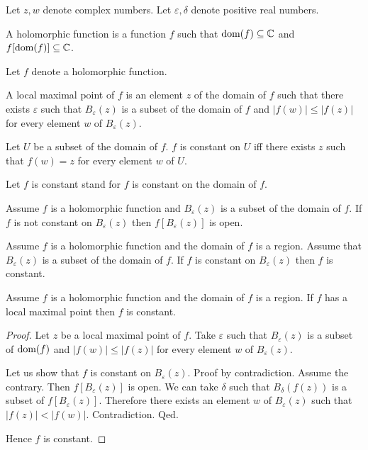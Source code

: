 \documentclass{article}
\newcommand{\Ball}[2]{B_{#1}(#2)}
\begin{document}
\begin{forthel}
Let $z, w$ denote complex numbers.
Let $\varepsilon, \delta$ denote positive real numbers.

\begin{signature}
  A holomorphic function is a function $f$ such that $\textrm{dom}(f) \subseteq \mathbb{C}$
  and $f[\textrm{dom}(f)] \subseteq \mathbb{C}$.
\end{signature}

Let $f$ denote a holomorphic function.

\begin{definition}
  A local maximal point of $f$ is an element $z$ of the domain of $f$ such that there exists
  $\varepsilon$ such that $\Ball{\varepsilon}{z}$ is a subset of the domain of $f$ and
  $|f(w)| \leq |f(z)|$ for every element $w$ of $\Ball{\varepsilon}{z}$.
\end{definition}

\begin{definition}
  Let $U$ be a subset of the domain of $f$. $f$ is constant on $U$ iff there exists
  $z$ such that $f(w) = z$ for every element $w$ of $U$.
\end{definition}

Let $f$ is constant stand for $f$ is constant on the domain of $f$.

\begin{axiom}
  Assume $f$ is a holomorphic function and $\Ball{\varepsilon}{z}$ is a subset of the domain of $f$.
  If $f$ is not constant on $\Ball{\varepsilon}{z}$
  then $f[\Ball{\varepsilon}{z}]$ is open.
\end{axiom}

\begin{axiom}
  Assume $f$ is a holomorphic function and the domain of $f$ is a region.
  Assume that $\Ball{\varepsilon}{z}$ is a subset of the domain of $f$.
  If $f$ is constant on $\Ball{\varepsilon}{z}$ then $f$ is constant.
\end{axiom}

\begin{proposition}
  Assume $f$ is a holomorphic function and the domain of $f$ is a region.
  If $f$ has a local maximal point then $f$ is constant.
\end{proposition}
\begin{proof}
  Let $z$ be a local maximal point of $f$.
  Take $\varepsilon$ such that
  $\Ball{\varepsilon}{z}$ is a subset of $\textrm{dom}(f)$
  and $|f(w)| \leq |f(z)|$ for every element $w$ of $\Ball{\varepsilon}{z}$.

  Let us show that $f$ is constant on $\Ball{\varepsilon}{z}$.\newline
  Proof by contradiction.
    Assume the contrary.
    Then $f[\Ball{\varepsilon}{z}]$ is open.
    We can take $\delta$ such that
    $\Ball{\delta}{f(z)}$ is a subset of $f[\Ball{\varepsilon}{z}]$.
    Therefore there exists an element $w$ of $\Ball{\varepsilon}{z}$ such that
    $|f(z)| < |f(w)|$.
    Contradiction.
  Qed.

  Hence $f$ is constant.
\end{proof}
\end{forthel}
\end{document}
